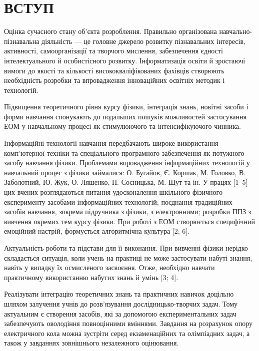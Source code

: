 \chapter*{ВСТУП}
{}

{\Large

Оцінка сучасного стану об’єкта розроблення. Правильно організована
навчально-пізнавальна діяльність --- це головне джерело розвитку пізнавальних
інтересів, активності, самоорганізації та творчого мислення, забезпечення єдності
інтелектуального й особистісного розвитку. Інформатизація освіти й зростаючі
вимоги до якості та кількості висококваліфікованих фахівців створюють
необхідність розробки та впровадження інноваційних освітніх методик і
технологій.

Підвищення теоретичного рівня курсу фізики, інтеграція знань, новітні
засоби і форми навчання спонукають до подальших пошуків можливостей
застосування ЕОМ у навчальному процесі як стимулюючого та інтенсифікуючого
чинника.

Інформаційні технології навчання передбачають широке використання
комп'ютерної техніки та спеціального програмного забезпечення як потужного
засобу навчання фізики. Проблемами впровадження інформаційних технологій у
навчальний процес з фізики займалися: О. Бугайов, Є. Коршак, М. Головко, В.
Заболотний, Ю. Жук, О. Ляшенко, Н. Сосницька, М. Шут та ін. У працях [1--5] цих %
вчених розглядаються питання удосконалення шкільного фізичного експерименту
засобами інформаційних технологій; поєднання традиційних засобів навчання,
зокрема підручника з фізики, з електронними; розробки ППЗ з вивчення окремих
тем курсу фізики. При роботі з ЕОМ створюється специфічний емоційний
настрій, формується алгоритмічна культура [2; 6].

Актуальність роботи та підстави для її виконання. При вивченні фізики
нерідко складається ситуація, коли учень на практиці не може застосувати набуті
знання, навіть у випадку їх осмисленого засвоєння. Отже, необхідно навчати
практичному використанню набутих знань й умінь [3; 4].

Реалізувати інтеграцію теоретичних знань та практичних навичок доцільно
шляхом залучення учнів до розв’язування дослідницько-творчих задач. Тому
актуальним є створення засобів, які за допомогою експериментальних задач
забезпечують оволодіння повноцінними вміннями. Завдання на розрахунок опору
електричного кола можна зустріти серед екзаменаційних та олімпіадних задач, а
також у завданнях зовнішнього незалежного оцінювання.

}

